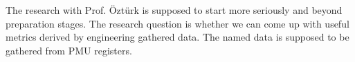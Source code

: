 \documentclass[11pt,a4paper]{article}
\begin{document}
The research with Prof. \"Ozt\"urk is supposed to start more seriously and beyond preparation
stages. The research question is whether we can come up with useful metrics derived by 
engineering gathered data. The named data is supposed to be gathered from PMU registers.


\end{document}
